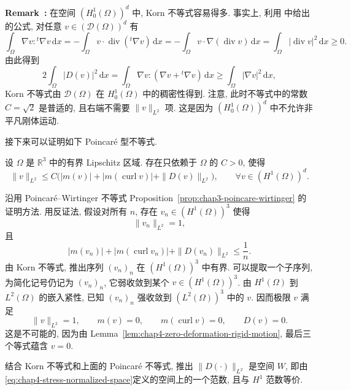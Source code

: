 \par\noindent{}\textbf{Remark~\thechapterfoursectionsevenremark:}\label{rem:chap4-korn-zero-boundary}\quad
在空间 $(H_0^1(\Omega))^d$ 中, Korn 不等式容易得多. 事实上, 利用 中给出的公式, 对任意 $v\in(\mathcal D(\Omega))^d$ 有
\[
 \int_\Omega\nabla v:{}^t\nabla v\,\mathrm dx
 =-\int_\Omega v\cdot\operatorname{div}({}^t\nabla v)\,\mathrm dx
 =-\int_\Omega v\cdot\nabla(\operatorname{div}v)\,\mathrm dx
 =\int_\Omega|\operatorname{div}v|^2\,\mathrm dx\geq0.
\]
由此得到
\begin{equation}
 2\int_\Omega|D(v)|^2\,\mathrm dx
 =\int_\Omega\nabla v:(\nabla v+{}^t\nabla v)\,\mathrm dx
 \geq\int_\Omega|\nabla v|^2\,\mathrm dx,
 \label{eq:chap4-korn-zero-boundary}
\end{equation}
Korn 不等式由 $\mathcal D(\Omega)$ 在 $H_0^1(\Omega)$ 中的稠密性得到. 注意, 此时不等式中的常数 $C=\sqrt2$ 是普适的, 且右端不需要 $\|v\|_{L^2}$ 项. 这是因为 $(H_0^1(\Omega))^d$ 中不允许非平凡刚体运动.

接下来可以证明如下 Poincaré 型不等式.

\begin{Proposition}
\label{prop:chap4-rigid-motion-poincare}
设 $\Omega$ 是 $\mathbb R^3$ 中的有界 Lipschitz 区域. 存在只依赖于 $\Omega$ 的 $C>0$, 使得
\[
 \|v\|_{L^2}
 \leq C\bigl(|m(v)|+|m(\operatorname{curl}v)|+\|D(v)\|_{L^2}\bigr),
 \qquad\forall v\in(H^1(\Omega))^d.
\]
\end{Proposition}

\begin{Proof}
沿用 Poincaré--Wirtinger 不等式 Proposition~\ref{prop:chap3-poincare-wirtinger} 的证明方法. 用反证法, 假设对所有 $n$, 存在 $v_n\in(H^1(\Omega))^3$ 使得
\[
 \|v_n\|_{L^2}=1,
\]
且
\[
 |m(v_n)|+|m(\operatorname{curl}v_n)|+\|D(v_n)\|_{L^2}\leq\frac1n.
\]
由 Korn 不等式, 推出序列 $(v_n)_n$ 在 $(H^1(\Omega))^3$ 中有界. 可以提取一个子序列, 为简化记号仍记为 $(v_n)_n$, 它弱收敛到某个 $v\in(H^1(\Omega))^3$. 由 $H^1(\Omega)$ 到 $L^2(\Omega)$ 的嵌入紧性, 已知 $(v_n)_n$ 强收敛到 $(L^2(\Omega))^3$ 中的 $v$. 因而极限 $v$ 满足
\[
 \|v\|_{L^2}=1,
 \qquad m(v)=0,
 \qquad m(\operatorname{curl}v)=0,
 \qquad D(v)=0.
\]
这是不可能的, 因为由 Lemma~\ref{lem:chap4-zero-deformation-rigid-motion}, 最后三个等式蕴含 $v=0$.
\end{Proof}

结合 Korn 不等式和上面的 Poincaré 不等式, 推出 $\|D(\cdot)\|_{L^2}$ 是空间 $W$, 即由\eqref{eq:chap4-stress-normalized-space}定义的空间上的一个范数, 且与 $H^1$ 范数等价.

